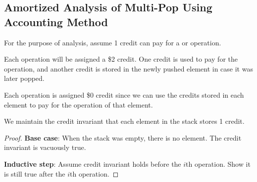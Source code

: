 \subsection{Amortized Analysis of Multi-Pop Using Accounting Method}

For the purpose of analysis, assume 1 credit can pay for a  or  operation.

Each  operation will be assigned a \$2 credit. One credit is used to pay for the  operation, and another credit is stored in the newly pushed element in case it was later popped.

Each  operation is assigned \$0 credit since we can use the credits stored in each element to pay for the  operation of that element.

We maintain the credit invariant that each element in the stack stores 1 credit.

\begin{proof}
    \hfill
    
    \textbf{Base case}: When the stack was empty, there is no element. The credit invariant is vacuously true.

    \textbf{Inductive step}: Assume credit invariant holds before the $i$th operation. Show it is still true after the $i$th operation.
\end{proof}